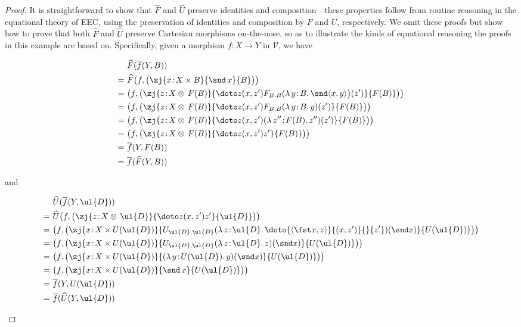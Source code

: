 \begin{proof}
It is straightforward to show that $\widehat{F}$ and $\widehat{U}$ preserve identities and composition---these properties follow from routine reasoning in the equational theory of EEC\raisebox{0.75pt}{+}, using the preservation of identities and composition by $F$ and $U$, respectively.
We omit these proofs but show how to prove that both $\widehat{F}$ and $\widehat{U}$ preserve Cartesian morphisms on-the-nose, so as to illustrate the kinds of equational reasoning the proofs in this example are based on. 
Specifically, given a morphism $f : X \longrightarrow Y$ in $\mathcal{V}$, we have 
\begin{fleqn}[0.3cm]
\begin{align*}
& \widehat{F}(\overline{f}(Y,B))
\\
=\,\, & \widehat{F}\big(f, \big(\zj {x \!:\! X \times B} {\snd\, x} {B}\big)\big)
\\
=\,\, &
\big(f, \big(\zj {z \!:\! X \otimes\, F(B)} {\doto z {(x,z')} {} {F_{B,B}(\lambda\, y \!:\! B .\, \snd \langle x,y \rangle\big)(z')}} {F(B)}\big)\big)
\\
=\,\, &
\big(f, \big(\zj {z \!:\! X \otimes\, F(B)} {\doto z {(x,z')} {} {F_{B,B}(\lambda\, y \!:\! B .\, y)(z')}} {F(B)}\big)\big)
\\
=\,\, &
\big(f, \big(\zj {z \!:\! X \otimes\, F(B)} {\doto z {(x,z')} {} {(\lambda\, z'' \!:\! F(B) .\, z'')(z')}} {F(B)}\big)\big)
\\
=\,\, &
\big(f, \big(\zj {z \!:\! X \otimes\, F(B)} {\doto z {(x,z')} {} {z'}} {F(B)}\big)\big)
\\
=\,\, & \overline{f}(Y,F(B))
\\
=\,\, & \overline{f}(\widehat{F}(Y,B))
\end{align*}
\end{fleqn}
and 
\begin{fleqn}[0.3cm]
\begin{align*}
& \widehat{U}(\overline{f}(Y,\ul{D}))
\\
=\,\, & \widehat{U}\big(f, \big(\zj {z \!:\! X \otimes\, \ul{D}} {\doto z {(x,z')} {} {z'}} {\ul{D}}\big)\big)
\\
=\,\, &
\big(f, \big(\zj {x \!:\! X \times U(\ul{D})} {U_{\ul{D},\ul{D}}(\lambda\, z \!:\! \ul{D} .\, \doto {\langle \fst x, z \rangle} {(x,z')} {} {z'})(\snd x)} {U(\ul{D})}\big)\big)
\\
=\,\, &
\big(f, \big(\zj {x \!:\! X \times U(\ul{D})} {U_{\ul{D},\ul{D}}(\lambda\, z \!:\! \ul{D} .\, z)(\snd x)} {U(\ul{D})}\big)\big)
\\
=\,\, &
\big(f, \big(\zj {x \!:\! X \times U(\ul{D})} {(\lambda\, y \!:\! U(\ul{D}) .\, y)(\snd x)} {U(\ul{D})}\big)\big)
\\
=\,\, &
\big(f, \big(\zj {x \!:\! X \times U(\ul{D})} {\snd\, x} {U(\ul{D})}\big)\big)
\\
=\,\, & \overline{f}(Y,U(\ul{D}))
\\
=\,\, & \overline{f}(\widehat{U}(Y,\ul{D}))
\end{align*}
\end{fleqn}


\end{proof}
